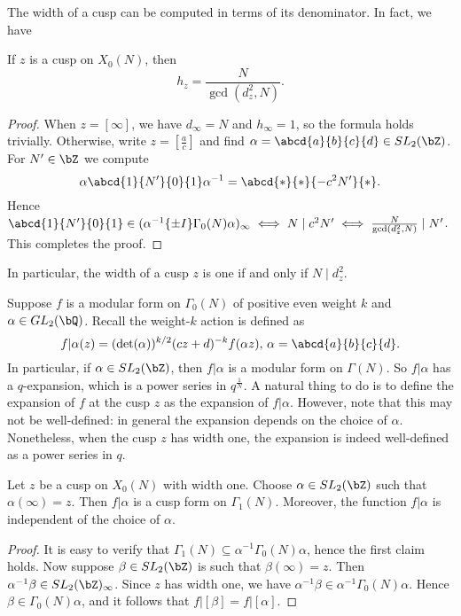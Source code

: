 \documentclass [11pt, proquest] {uwthesis}[2015/03/03]
\begin{document}
The width of a cusp can be computed in terms of its denominator. In fact, we have
\begin{Lemma}
If $z$ is a cusp on $X_0(N)$, then
$$h_z = \frac{N}{\gcd(d_z^2, N)}.$$
\end{Lemma}

\begin{proof}
When $z = [\infty]$, we have $d_\infty = N$ and $h_\infty =  1$, so the formula holds trivially. Otherwise, write $z = [\frac{a}{c}]$ and find $\alpha = \abcd{a}{b}{c}{d} \in SL_2(\bZ)$. For $N' \in \bZ$ we compute 
\[
	\alpha   \abcd{1}{N'}{0}{1} \alpha^{-1} = \abcd{*}{*}{-c^2N'}{*}.
\]
Hence $\abcd{1}{N'}{0}{1}  \in  (\alpha^{-1} \{\pm I\} \Gamma_0(N) \alpha)_\infty \iff N \mid c^2 N' \iff \frac{N}{\gcd(d_z^2, N)} \mid N'$. This completes the proof.
\end{proof}

In particular, the width of a cusp $z$ is one if and only if $N \mid d_z^2$. 

Suppose $f$ is a modular form on $\Gamma_0(N)$ of positive even weight $k$ and $\alpha \in GL_2(\bQ)$. Recall the weight-$k$ action is defined as 
\[
	f | \alpha (z)  = (\det(\alpha))^{k/2} (cz+d)^{-k} f(\alpha z), \, \alpha = \abcd{a}{b}{c}{d}.
\]
In particular, if $\alpha \in SL_2(\bZ)$, then $f | \alpha $ is a modular form on $\Gamma(N)$. So $f | \alpha $ has a $q$-expansion, which is a power series in $q^{\frac{1}{N}}$. A natural thing to do is to define the expansion of $f$ at the cusp $z$ as the expansion of $f | \alpha$. However,  note that this may not be well-defined: in general the expansion depends on the choice of $\alpha$. Nonetheless, when the cusp $z$ has width one, the expansion is indeed well-defined as a power series in $q$. 

\begin{Lemma}
Let $z$ be a cusp on $X_0(N)$ with width one. Choose $\alpha \in SL_2(\bZ)$ such that 
$\alpha(\infty) =z$. Then $f | \alpha$ is a cusp form on $\Gamma_1(N)$. Moreover, the function $f|\alpha $ is independent of the choice of $\alpha$. 
\end{Lemma}

\begin{proof}
It is easy to verify that $\Gamma_1(N) \subseteq \alpha^{-1} \Gamma_0(N) \alpha$, hence the first claim holds. Now suppose $\beta \in SL_2(\bZ)$ is such that $\beta(\infty) = z$. Then $\alpha^{-1} \beta \in SL_2(\bZ)_\infty$. Since $z$ has width one, we have $\alpha^{-1} \beta \in \alpha^{-1}\Gamma_0(N) \alpha$. Hence $\beta \in \Gamma_0(N) \alpha$, and it follows that $f | [\beta] = f | [\alpha]$.
\end{proof}
\end{document}
